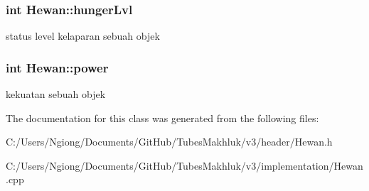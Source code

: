 \subsubsection[{\texorpdfstring{hunger\+Lvl}{hungerLvl}}]{\setlength{\rightskip}{0pt plus 5cm}int Hewan\+::hunger\+Lvl\hspace{0.3cm}{\ttfamily [protected]}}\hypertarget{class_hewan_ac2181643305f48f23c648b58d5b662b5}{}\label{class_hewan_ac2181643305f48f23c648b58d5b662b5}
status level kelaparan sebuah objek 
\subsubsection[{\texorpdfstring{power}{power}}]{\setlength{\rightskip}{0pt plus 5cm}int Hewan\+::power\hspace{0.3cm}{\ttfamily [protected]}}\hypertarget{class_hewan_a3fbf8081066fe2fb2b7b8cce149910a1}{}\label{class_hewan_a3fbf8081066fe2fb2b7b8cce149910a1}
kekuatan sebuah objek 

The documentation for this class was generated from the following files\+:\begin{DoxyCompactItemize}
\item 
C\+:/\+Users/\+Ngiong/\+Documents/\+Git\+Hub/\+Tubes\+Makhluk/v3/header/Hewan.\+h\item 
C\+:/\+Users/\+Ngiong/\+Documents/\+Git\+Hub/\+Tubes\+Makhluk/v3/implementation/Hewan.\+cpp\end{DoxyCompactItemize}
